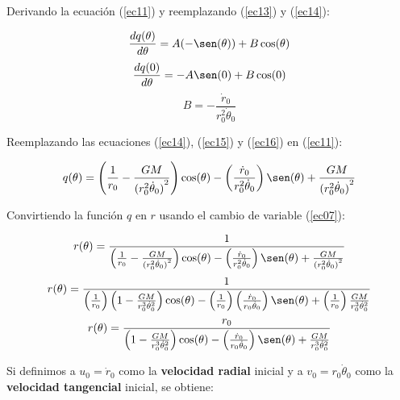 \documentclass[letter,11pt]{article}
\begin{document}
Derivando la ecuación (\ref{ec11}) y reemplazando (\ref{ec13}) y (\ref{ec14}):

\begin{equation*}
    \frac{dq(\theta)}{d\theta}=A(-\sen(\theta))+B\cos(\theta)
\end{equation*}
\begin{equation*}
    \frac{dq(0)}{d\theta}=-A\sen(0)+B\cos(0)
\end{equation*}
\begin{equation}
    B=-\frac{\dot{r}_0}{r^2_0\dot{\theta}_0}
    \label{ec16}
\end{equation}

Reemplazando las ecuaciones (\ref{ec14}), (\ref{ec15}) y (\ref{ec16}) en
(\ref{ec11}):

\begin{equation*}
    q(\theta)=\left(
        \frac{1}{r_0}-\frac{GM}{{(r^2_0\dot{\theta}_0)}^2}
    \right)\cos(\theta)-\left(
        \frac{\dot{r}_0}{r^2_0\dot{\theta}_0}
    \right)\sen(\theta)+\frac{GM}{{(r^2_0\dot{\theta}_0)}^2}
\end{equation*}

Convirtiendo la función $q$ en $r$ usando el cambio de variable (\ref{ec07}):

\begin{equation*}
    r(\theta)=\frac{1}{\left(
        \frac{1}{r_0}-\frac{GM}{{(r^2_0\dot{\theta}_0)}^2}
    \right)\cos(\theta)-\left(
        \frac{\dot{r}_0}{r^2_0\dot{\theta}_0}
    \right)\sen(\theta)+\frac{GM}{{(r^2_0\dot{\theta}_0)}^2}}
\end{equation*}
\begin{equation*}
    r(\theta)=\frac{1}{\left(
        \frac{1}{r_0}
    \right)\left(
        1-\frac{GM}{r^3_0\dot{\theta}^2_0}
    \right)\cos(\theta)-\left(
        \frac{1}{r_0}
    \right)\left(
        \frac{\dot{r}_0}{r_0\dot{\theta}_0}
    \right)\sen(\theta)+\left(
        \frac{1}{r_0}
    \right)\frac{GM}{r^3_0\dot{\theta}^2_0}}
\end{equation*}
\begin{equation*}
    r(\theta)=\frac{r_0}{\left(
        1-\frac{GM}{r^3_0\dot{\theta}^2_0}
    \right)\cos(\theta)-\left(
        \frac{\dot{r}_0}{r_0\dot{\theta}_0}
    \right)\sen(\theta)+\frac{GM}{r^3_0\dot{\theta}^2_0}}
\end{equation*}

Si definimos a $u_0=\dot{r}_0$ como la \textbf{velocidad radial} inicial y a
$v_0=r_0\dot{\theta}_0$ como la \textbf{velocidad tangencial} inicial, se
obtiene:
\end{document}
